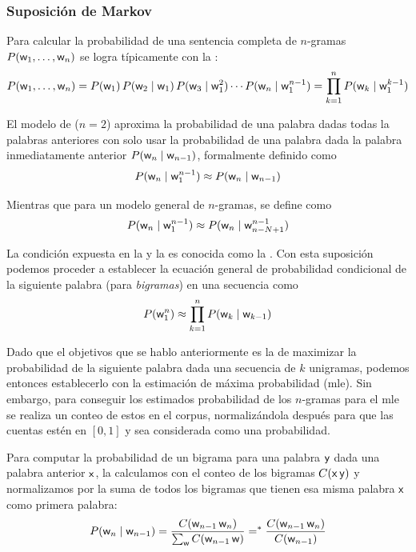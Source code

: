\subsubsection{Suposición de Markov}
Para calcular la probabilidad de una sentencia completa de $n$-gramas $P({\mathit{\mathsf{w}}}_1, \ldots, {\mathit{\mathsf{w}}}_n)$ se logra típicamente con la :
\begin{equation}
  P({\mathit{\mathsf{w}}}_1, \ldots, {\mathit{\mathsf{w}}}_n) = P({\mathit{\mathsf{w}}}_1)\, P({\mathit{\mathsf{w}}}_2 \mid {\mathit{\mathsf{w}}}_1)\, P({\mathit{\mathsf{w}}}_3 \mid {\mathit{\mathsf{w}}}_1^2) \cdots P({\mathit{\mathsf{w}}}_n \mid {\mathit{\mathsf{w}}}_1^{n-1}) = \prod_{k=1}^{n} P({\mathit{\mathsf{w}}}_k \mid {\mathit{\mathsf{w}}}_1^{k-1})
\end{equation}

El modelo de  ($n=2$) aproxima la probabilidad de una palabra dadas todas la palabras anteriores  con solo usar la probabilidad de una palabra dada la palabra inmediatamente anterior $P({\mathit{\mathsf{w}}}_n \mid {\mathit{\mathsf{w}}}_{n-1})$, formalmente definido como
\begin{equation} \label{eq:markov-assumption-bigram}
  P({\mathit{\mathsf{w}}}_n \mid {\mathit{\mathsf{w}}}_1^{n-1}) \approx P({\mathit{\mathsf{w}}}_n \mid {\mathit{\mathsf{w}}}_{n-1})
\end{equation}

Mientras que para un modelo general de $n$-gramas, se define como
\begin{equation} \label{eq:markov-assumption}
  P({\mathit{\mathsf{w}}}_n \mid {\mathit{\mathsf{w}}}_1^{n-1}) \approx P({\mathit{\mathsf{w}}}_n \mid {\mathit{\mathsf{w}}}_{n-N+1}^{n-1})
\end{equation}

La condición expuesta en la  y la  es conocida como la . Con esta suposición podemos proceder a establecer la ecuación general de probabilidad condicional de la siguiente palabra (para \textit{bigramas}) en una secuencia como
\begin{equation}
  P({\mathit{\mathsf{w}}}_1^{n}) \approx \prod_{k=1}^{n} P({\mathit{\mathsf{w}}}_k \mid {\mathit{\mathsf{w}}}_{k-1})
\end{equation}

Dado que el objetivos que se hablo anteriormente es la de maximizar la probabilidad de la siguiente palabra dada una secuencia de $k$ unigramas, podemos entonces establecerlo con la estimación de máxima probabilidad (\gls{mle}). Sin embargo, para conseguir los estimados probabilidad de los $n$-gramas para el \gls{mle} se realiza un conteo de estos en el \gls{corpus}, normalizándola después para que las cuentas estén en $[0, 1]$ y sea considerada como una probabilidad.

Para computar la probabilidad de un bigrama para una palabra ${\mathit{\mathsf{y}}}$ dada una palabra anterior ${\mathit{\mathsf{x}}}$, la calculamos con el conteo de los bigramas $C({\mathit{\mathsf{x}}} \, {\mathit{\mathsf{y}}})$ y normalizamos por la suma de todos los bigramas que tienen esa misma palabra ${\mathit{\mathsf{x}}}$ como primera palabra:
\begin{equation} \label{eq:bigram-prob-computation}
  P({\mathit{\mathsf{w}}}_n \mid {\mathit{\mathsf{w}}}_{n-1}) = \frac{C( {\mathit{\mathsf{w}}}_{n-1} \, {\mathit{\mathsf{w}}}_{n})}{ \sum_{\mathit{\mathsf{w}}} C({\mathit{\mathsf{w}}}_{n-1} \, {\mathit{\mathsf{w}}}) } =^{\ast} \frac{C( {\mathit{\mathsf{w}}}_{n-1} \, {\mathit{\mathsf{w}}}_{n})}{ C({\mathit{\mathsf{w}}}_{n-1}) }
\end{equation}

